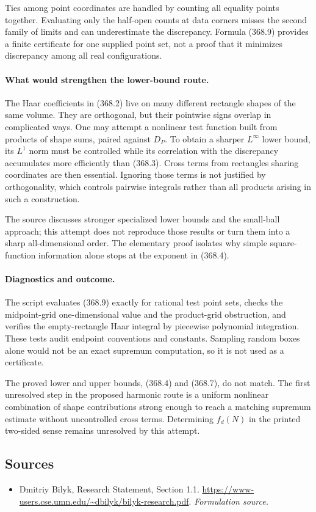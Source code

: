 \documentclass[11pt]{article}
\begin{document}
Ties among point coordinates are handled by counting all equality
points together. Evaluating only the half-open counts at data
corners misses the second family of limits and can underestimate
the discrepancy. Formula (368.9) provides a finite certificate for
one supplied point set, not a proof that it minimizes discrepancy
among all real configurations.

\paragraph{What would strengthen the lower-bound route.}
The Haar coefficients in (368.2) live on many different rectangle
shapes of the same volume. They are orthogonal, but their pointwise
signs overlap in complicated ways. One may attempt a nonlinear test
function built from products of shape sums, paired against $D_P$.
To obtain a sharper $L^\infty$ lower bound, its $L^1$ norm must be
controlled while its correlation with the discrepancy accumulates
more efficiently than (368.3). Cross terms from rectangles sharing
coordinates are then essential. Ignoring those terms is not justified
by orthogonality, which controls pairwise integrals rather than
all products arising in such a construction.

The source discusses stronger specialized lower bounds and the
small-ball approach; this attempt does not reproduce those results
or turn them into a sharp all-dimensional order. The elementary
proof isolates why simple square-function information alone stops
at the exponent in (368.4).

\paragraph{Diagnostics and outcome.}
The script evaluates (368.9) exactly for rational test point sets,
checks the midpoint-grid one-dimensional value and the product-grid
obstruction, and verifies the empty-rectangle Haar integral by
piecewise polynomial integration. These tests audit endpoint
conventions and constants. Sampling random boxes alone would not
be an exact supremum computation, so it is not used as a certificate.

The proved lower and upper bounds, (368.4) and (368.7), do not match.
The first unresolved step in the proposed harmonic route is a
uniform nonlinear combination of shape contributions strong enough
to reach a matching supremum estimate without uncontrolled cross
terms. Determining $f_d(N)$ in the printed two-sided sense remains
unresolved by this attempt.
\subsection{Sources}
\begin{itemize}
\item[S1]Dmitriy Bilyk, Research Statement, Section 1.1.
\url{https://www-users.cse.umn.edu/~dbilyk/bilyk-research.pdf}.
\textit{Formulation source.}
\end{itemize}
\end{document}
